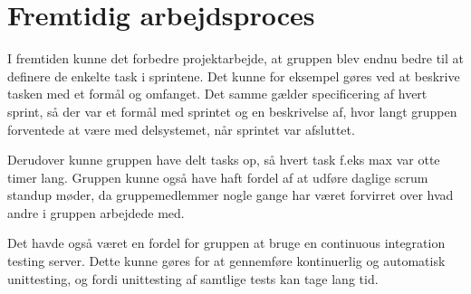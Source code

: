 \section{Fremtidig arbejdsproces}
I fremtiden kunne det forbedre projektarbejde, at gruppen blev endnu bedre til at definere de enkelte task i sprintene. Det kunne for eksempel gøres ved at beskrive tasken med et formål og omfanget. Det samme gælder specificering af hvert sprint, så der var et formål med sprintet og en beskrivelse af, hvor langt gruppen forventede at være med delsystemet, når sprintet var afsluttet.

Derudover kunne gruppen have delt tasks op, så hvert task f.eks max var otte timer lang. Gruppen kunne også have haft fordel af at udføre daglige scrum standup møder, da gruppemedlemmer nogle gange har været forvirret over hvad andre i gruppen arbejdede med.

Det havde også været en fordel for gruppen at bruge en continuous integration testing server. Dette kunne gøres for at gennemføre kontinuerlig og automatisk unittesting, og fordi unittesting af samtlige tests kan tage lang tid.